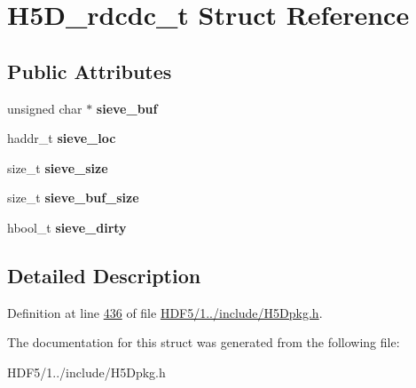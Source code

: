\hypertarget{struct_h5_d__rdcdc__t}{}\section{H5\+D\+\_\+rdcdc\+\_\+t Struct Reference}
\label{struct_h5_d__rdcdc__t}
\subsection*{Public Attributes}
\begin{DoxyCompactItemize}
\item 
\mbox{\label{struct_h5_d__rdcdc__t_ad815fd06662efba5d5a67162b29bcab4}} 
unsigned char $\ast$ {\bfseries sieve\+\_\+buf}
\item 
\mbox{\label{struct_h5_d__rdcdc__t_a11f6d9e862cdfb9552b9480146b236e0}} 
haddr\+\_\+t {\bfseries sieve\+\_\+loc}
\item 
\mbox{\label{struct_h5_d__rdcdc__t_a87f5698abdc384a15858fb9850fed850}} 
size\+\_\+t {\bfseries sieve\+\_\+size}
\item 
\mbox{\label{struct_h5_d__rdcdc__t_a13a86e7287a6231ba1bcf9c8119a2d56}} 
size\+\_\+t {\bfseries sieve\+\_\+buf\+\_\+size}
\item 
\mbox{\label{struct_h5_d__rdcdc__t_a3aec5e29e60be0b20e1917d5deb64f99}} 
hbool\+\_\+t {\bfseries sieve\+\_\+dirty}
\end{DoxyCompactItemize}


\subsection{Detailed Description}


Definition at line \hyperlink{_h_d_f5_21_810_81_2include_2_h5_dpkg_8h_source_l00436}{436} of file \hyperlink{_h_d_f5_21_810_81_2include_2_h5_dpkg_8h_source}{H\+D\+F5/1../include/\+H5\+Dpkg.\+h}.



The documentation for this struct was generated from the following file\+:\begin{DoxyCompactItemize}
\item 
H\+D\+F5/1../include/\+H5\+Dpkg.\+h\end{DoxyCompactItemize}
